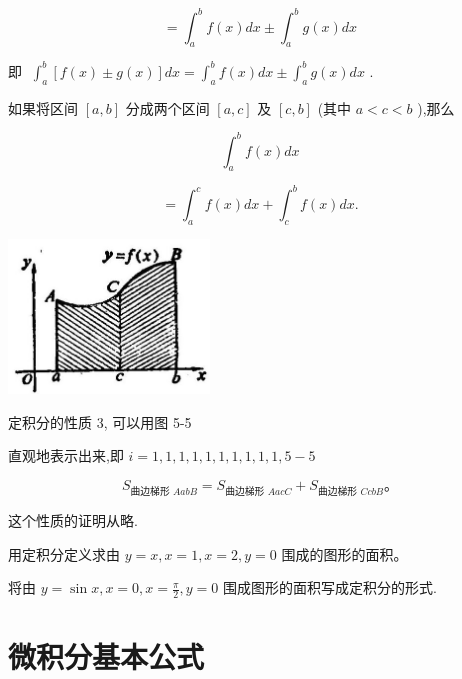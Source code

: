 \documentclass[lang=cn,newtx,10pt,scheme=chinese]{elegantbook}
\begin{document}
\[
= {\int }_{a}^{b}f\left( x\right) {dx} \pm {\int }_{a}^{b}g\left( x\right) {dx}
\]

即 \(\;{\int }_{a}^{b}\left\lbrack {f\left( x\right) \pm g\left( x\right) }\right\rbrack {dx} = {\int }_{a}^{b}f\left( x\right) {dx} \pm {\int }_{a}^{b}g\left( x\right) {dx}\) .

\begin{proposition}[性质3]

如果将区间 \(\left\lbrack {a,b}\right\rbrack\) 分成两个区间 \(\left\lbrack {a,c}\right\rbrack\) 及 \(\left\lbrack {c,b}\right\rbrack\) (其中 \(a < c < b\) ),那么

\[
{\int }_{a}^{b}f\left( x\right) {dx}
\]

\[
= {\int }_{a}^{c}f\left( x\right) {dx} + {\int }_{c}^{b}f\left( x\right) {dx}.
\]

\end{proposition}

\begin{center}
\includegraphics[max width=0.4\textwidth]{images/01912c18-5c3f-733d-b775-749ba9897a9d_224_842112.jpg}
\end{center}

定积分的性质 3, 可以用图 5-5

直观地表示出来,即 \(i = 1,1,1,1,1,1,1,1,1,1,5 - 5\)

\[
{S}_{\text{曲边梯形 }{AabB}} = {S}_{\text{曲边梯形 }{AacC}} + {S}_{\text{曲边梯形 }{CcbB}}\text{。}
\]

这个性质的证明从略.

\begin{problemset}[练习]

\item 用定积分定义求由 \(y = x,x = 1,x = 2,y = 0\) 围成的图形的面积。

\item 将由 \(y = \sin x,x = 0,x = \frac{\pi }{2},y = 0\) 围成图形的面积写成定积分的形式.

\end{problemset}

\section{微积分基本公式}
\end{document}
